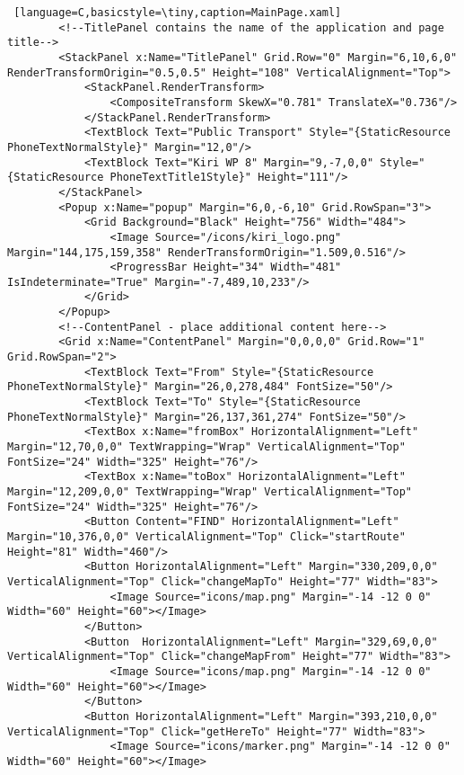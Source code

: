 \begin{lstlisting} [language=C,basicstyle=\tiny,caption=MainPage.xaml]
        <!--TitlePanel contains the name of the application and page title-->
        <StackPanel x:Name="TitlePanel" Grid.Row="0" Margin="6,10,6,0" RenderTransformOrigin="0.5,0.5" Height="108" VerticalAlignment="Top">
            <StackPanel.RenderTransform>
                <CompositeTransform SkewX="0.781" TranslateX="0.736"/>
            </StackPanel.RenderTransform>
            <TextBlock Text="Public Transport" Style="{StaticResource PhoneTextNormalStyle}" Margin="12,0"/>
            <TextBlock Text="Kiri WP 8" Margin="9,-7,0,0" Style="{StaticResource PhoneTextTitle1Style}" Height="111"/>
        </StackPanel>
        <Popup x:Name="popup" Margin="6,0,-6,10" Grid.RowSpan="3">
            <Grid Background="Black" Height="756" Width="484">
                <Image Source="/icons/kiri_logo.png" Margin="144,175,159,358" RenderTransformOrigin="1.509,0.516"/>
                <ProgressBar Height="34" Width="481" IsIndeterminate="True" Margin="-7,489,10,233"/>
            </Grid>
        </Popup>
        <!--ContentPanel - place additional content here-->
        <Grid x:Name="ContentPanel" Margin="0,0,0,0" Grid.Row="1" Grid.RowSpan="2">
            <TextBlock Text="From" Style="{StaticResource PhoneTextNormalStyle}" Margin="26,0,278,484" FontSize="50"/>
            <TextBlock Text="To" Style="{StaticResource PhoneTextNormalStyle}" Margin="26,137,361,274" FontSize="50"/>
            <TextBox x:Name="fromBox" HorizontalAlignment="Left" Margin="12,70,0,0" TextWrapping="Wrap" VerticalAlignment="Top" FontSize="24" Width="325" Height="76"/>
            <TextBox x:Name="toBox" HorizontalAlignment="Left" Margin="12,209,0,0" TextWrapping="Wrap" VerticalAlignment="Top" FontSize="24" Width="325" Height="76"/>
            <Button Content="FIND" HorizontalAlignment="Left" Margin="10,376,0,0" VerticalAlignment="Top" Click="startRoute" Height="81" Width="460"/>
            <Button HorizontalAlignment="Left" Margin="330,209,0,0" VerticalAlignment="Top" Click="changeMapTo" Height="77" Width="83">
                <Image Source="icons/map.png" Margin="-14 -12 0 0" Width="60" Height="60"></Image>
            </Button>
            <Button  HorizontalAlignment="Left" Margin="329,69,0,0" VerticalAlignment="Top" Click="changeMapFrom" Height="77" Width="83">
                <Image Source="icons/map.png" Margin="-14 -12 0 0" Width="60" Height="60"></Image>
            </Button>
            <Button HorizontalAlignment="Left" Margin="393,210,0,0" VerticalAlignment="Top" Click="getHereTo" Height="77" Width="83">
                <Image Source="icons/marker.png" Margin="-14 -12 0 0" Width="60" Height="60"></Image>

\end{lstlisting}
